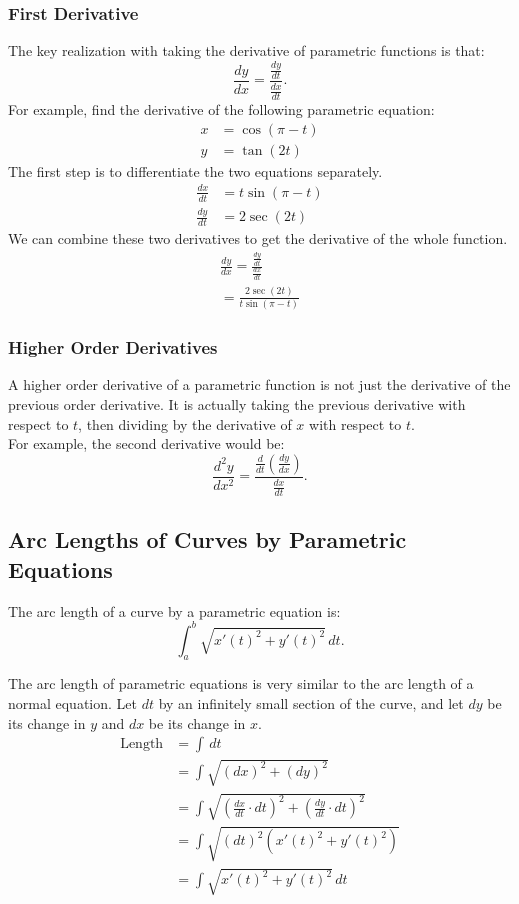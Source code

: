 \documentclass[12pt]{article}
\begin{document}
\subsubsection{First Derivative}
The key realization with taking the derivative of parametric functions is that:
\[ \frac{dy}{dx} = \frac{\frac{dy}{dt}}{\frac{dx}{dt}}. \]
For example, find the derivative of the following parametric equation:
\begin{align*}
    x & = \cos(\pi - t) \\
    y & = \tan(2t)
\end{align*}
The first step is to differentiate the two equations separately.
\begin{align*}
    \frac{dx}{dt} & = t \sin(\pi - t) \\[6pt]
    \frac{dy}{dt} & = 2 \sec(2t)
\end{align*}
We can combine these two derivatives to get the derivative of the whole function.
\begin{gather*}
    \frac{dy}{dx} = \frac{\frac{dy}{dt}}{\frac{dx}{dt}} \\[6pt]
    = \frac{2 \sec(2t)}{t \sin(\pi - t)}
\end{gather*}

\subsubsection{Higher Order Derivatives}
A higher order derivative of a parametric function is not just the derivative of the previous order derivative. It is actually taking the previous derivative with respect to $t$, then dividing by the derivative of $x$ with respect to $t$.
\\ For example, the second derivative would be:
\[ \frac{d^2 y}{dx^2} = \frac{\frac{d}{dt} \left( \frac{dy}{dx} \right)}{\frac{dx}{dt}}. \]

\subsection{Arc Lengths of Curves by Parametric Equations}
The arc length of a curve by a parametric equation is:
\[ \int_a^b \sqrt{x'(t)^2 + y'(t)^2} \, dt. \]

The arc length of parametric equations is very similar to the arc length of a normal equation. Let $dt$ by an infinitely small section of the curve, and let $dy$ be its change in $y$ and $dx$ be its change in $x$.
\begin{align*}
    \text{Length} & = \int \, dt                                                                                    \\
                  & = \int \sqrt{(dx)^2 + (dy)^2}                                                                   \\
                  & = \int \sqrt{\left( \frac{dx}{dt} \cdot dt \right)^2 + \left( \frac{dy}{dt} \cdot dt \right)^2} \\[6pt]
                  & = \int \sqrt{(dt)^2 \left( x'(t)^2 + y'(t)^2 \right)}                                           \\
                  & = \int \sqrt{x'(t)^2 + y'(t)^2} \, dt
\end{align*}
\end{document}
